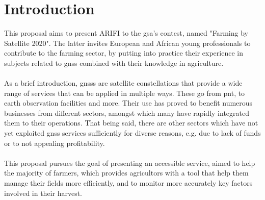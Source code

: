 \section{Introduction}
This proposal aims to present ARIFI to the  \gls{gsa}'s contest, named "Farming by Satellite 2020". The latter invites European and African young professionals to contribute to the farming sector, by putting into practice their experience in subjects related to \gls{gnss} combined with their knowledge in agriculture.\\\\%
%
%
As a brief introduction, \gls{gnss}s are satellite constellations that provide a wide range of services that can be applied in multiple ways. These go from \gls{pnt}, to earth observation facilities and more. Their use has proved to benefit numerous businesses from different sectors, amongst which many have rapidly integrated them to their operations. That being said, there are other sectors which have not yet exploited \gls{gnss} services sufficiently for diverse reasons, e.g. due to lack of funds or to not appealing profitability.\\\\
% 
%
This proposal pursues the goal of presenting an accessible service, aimed to help the majority of farmers, which provides agricultors with a tool that help them manage their fields more efficiently, and to monitor more accurately key factors involved in their harvest. 



